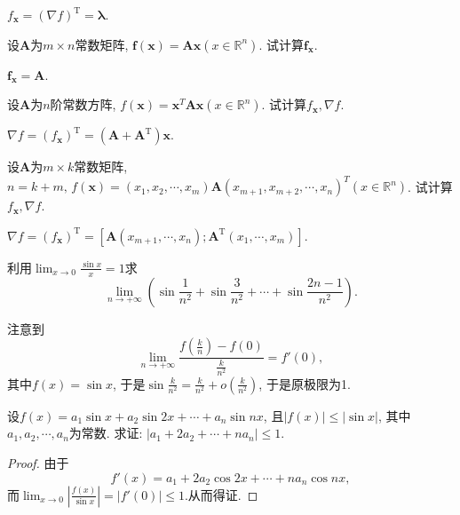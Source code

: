 \begin{quiza}
\begin{solution}
\(f_{\boldsymbol{x}}=(\nabla f)^\mathrm{T}=\boldsymbol{\lambda}\).
\end{solution}
\woe 设\(\boldsymbol{A}\)为\(m\times n\)常数矩阵, \(\boldsymbol{f}(\boldsymbol{x})=\boldsymbol{Ax}(x\in\mathbb{R}^n)\). 试计算\(\boldsymbol{f_x}\).
\begin{solution}
\(\boldsymbol{f_x}=\boldsymbol{A}\).
\end{solution}
\woe 设\(\boldsymbol{A}\)为\(n\)阶常数方阵, \(f(\boldsymbol{x})=\boldsymbol{x}^T\boldsymbol{A}\boldsymbol{x}(x\in\mathbb{R}^n)\). 试计算\(f_{\boldsymbol{x}},\nabla f\).
\begin{solution}
\(\nabla f=(f_{\boldsymbol{x}})^\mathrm{T}=(\boldsymbol{A}+\boldsymbol{A}^\mathrm{T})\boldsymbol{x}\).
\end{solution}
\woe 设\(\boldsymbol{A}\)为\(m\times k\)常数矩阵, \(n=k+m,\,f(\boldsymbol{x})=(x_1,x_2,\cdots,x_m)\boldsymbol{A}(x_{m+1},x_{m+2},\cdots,x_n)^T(x\in\mathbb{R}^n)\). 试计算\(f_{\boldsymbol{x}},\nabla f\).
\begin{solution}
\(\nabla f=(f_{\boldsymbol{x}})^\mathrm{T}=[\boldsymbol{A}(x_{m+1},\cdots,x_{n});\boldsymbol{A}^\mathrm{T}(x_1,\cdots,x_m)]\).
\end{solution}
\woe 利用\(\lim_{x\rightarrow 0}\frac{\sin x}{x}=1\)求\[\lim_{n\rightarrow+\infty}\left(\sin\frac{1}{n^2}+\sin\frac{3}{n^2}+\cdots+\sin\frac{2n-1}{n^2}\right).\]
\begin{solution}
注意到\[\lim_{n\rightarrow+\infty}\frac{f\left(\displaystyle\frac{k}{n}\right)-f(0)}{\displaystyle\frac{k}{n^2}}=f'(0),\]其中\(f(x)=\sin x\), 于是\(\sin\frac{k}{n^2}=\frac{k}{n^2}+o\left(\frac{k}{n^2}\right)\), 于是原极限为1.
\end{solution}
\woe 设\(f(x)=a_1\sin x+a_2\sin 2x+\cdots+a_n\sin nx\), 且\(|f(x)|\leqslant|\sin x|\), 其中\(a_1,a_2,\cdots,a_n\)为常数. 求证: \(|a_1+2a_2+\cdots+na_n|\leqslant 1\).
\begin{proof}
由于\[f'(x)=a_1+2a_2\cos 2x+\cdots+na_n\cos nx,\]而\(\lim_{x\rightarrow 0}\left|\frac{f(x)}{\sin x}\right|=|f'(0)|\leqslant 1.\)从而得证.
\end{proof}
\end{quiza}
